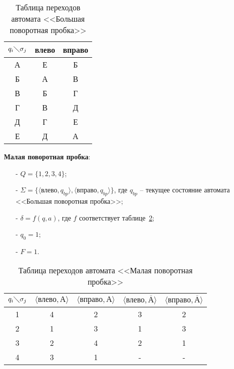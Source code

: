 \begin{table} [htbp]
  \centering
  \parbox{15cm}{\caption{Таблица переходов автомата <<Большая поворотная пробка>>}\label{tab:BP}}
  \begin{center}
  \begin{tabular}{| c | c | c |}
  \hline
  $q_i \diagdown \sigma_j$& влево & вправо \\
  \hline
  А & Е & Б\\
  \hline
  Б & А & В\\
  \hline
  В & Б & Г\\
  \hline
  Г & В & Д\\
  \hline
  Д & Г & Е\\
  \hline
  Е & Д & А\\
  \hline
  \end{tabular}
  \end{center}
\end{table}



\textbf{Малая поворотная пробка}:
\begin{itemize}
 \item [-] $Q = \{1, 2, 3, 4\}$;
 \item [-] $\Sigma = \{\langle \text{влево}, q_{bp}\rangle, \langle \text{вправо}, q_{bp}\rangle\}$, где $q_{bp}$ -- текущее состояние автомата <<Большая поворотная пробка>>;
 \item [-] $\delta = f (q, a)$, где $f$ соответствует таблице~\ref{tab:SP};
 \item [-] $q_0 = 1$;
 \item [-] $F = 1$.
\end{itemize}

\begin{table} [htbp]
  \centering
  \parbox{15cm}{\caption{Таблица переходов автомата <<Малая поворотная пробка>>}\label{tab:SP}}
  \begin{center}
  \begin{tabular}{| c | c | c | c | c |}
  \hline
  $q_i \diagdown \sigma_j$ & $\langle \text{влево}, \text{А} \rangle$ & $\langle \text{вправо}, \text{А}\rangle$ & $\langle \text{влево}, \overline{\text{А}}\rangle$ & $\langle \text{вправо}, \overline{\text{А}}\rangle$\\
  \hline
  1 &4&2&3&2\\
  \hline
  2 &1&3&1&3\\
  \hline
  3 &2&4&2&1\\
  \hline
  4 &3&1&-&-\\
  \hline
  \end{tabular}
  \end{center}
\end{table}

